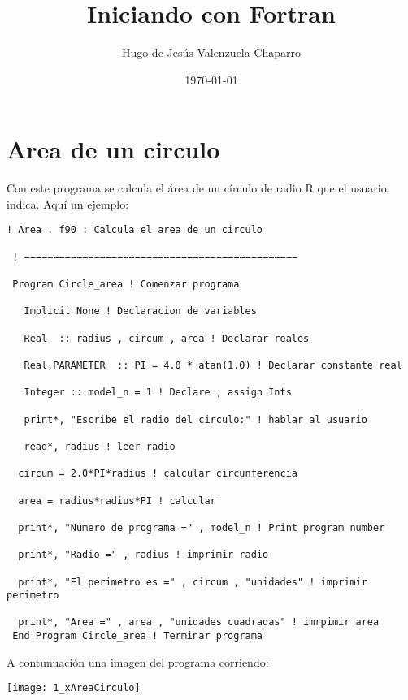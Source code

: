 \documentclass[notitlepage,12pt]{article}
\title{Iniciando con Fortran}
\author{Hugo de Jes\'us Valenzuela Chaparro}
\date{\today}
\begin{document}
\maketitle

\section{Area de un circulo}
Con este programa se calcula el \'area de un c\'irculo de radio R que el usuario indica.
Aqu\'i un ejemplo:
\begin{verbatim}
! Area . f90 : Calcula el area de un circulo

 ! −−−−−−−−−−−−−−−−−−−−−−−−−−−−−−−−−−−−−−−−−−−−−−−

 Program Circle_area ! Comenzar programa

   Implicit None ! Declaracion de variables

   Real  :: radius , circum , area ! Declarar reales

   Real,PARAMETER  :: PI = 4.0 * atan(1.0) ! Declarar constante real

   Integer :: model_n = 1 ! Declare , assign Ints

   print*, "Escribe el radio del circulo:" ! hablar al usuario

   read*, radius ! leer radio

  circum = 2.0*PI*radius ! calcular circunferencia

  area = radius*radius*PI ! calcular

  print*, "Numero de programa =" , model_n ! Print program number

  print*, "Radio =" , radius ! imprimir radio

  print*, "El perimetro es =" , circum , "unidades" ! imprimir perimetro

  print*, "Area =" , area , "unidades cuadradas" ! imrpimir area
 End Program Circle_area ! Terminar programa
\end{verbatim}
A contunuaci\'on una imagen del programa corriendo:



\texttt{[image: 1\_xAreaCirculo]}
\end{document}
